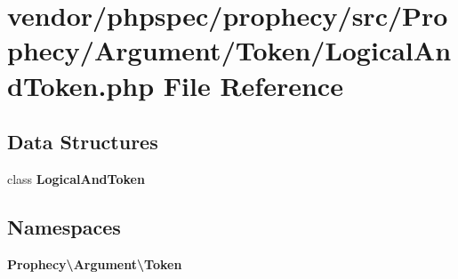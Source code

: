 \section{vendor/phpspec/prophecy/src/\+Prophecy/\+Argument/\+Token/\+Logical\+And\+Token.php File Reference}
\label{_logical_and_token_8php}
\subsection*{Data Structures}
\begin{DoxyCompactItemize}
\item 
class {\bf Logical\+And\+Token}
\end{DoxyCompactItemize}
\subsection*{Namespaces}
\begin{DoxyCompactItemize}
\item 
 {\bf Prophecy\textbackslash{}\+Argument\textbackslash{}\+Token}
\end{DoxyCompactItemize}
